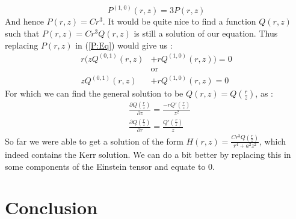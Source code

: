 \documentclass[a4paper,12pt]{article}
\theoremstyle{definition}
\begin{document}
\begin{equation*}
	P^{(1,0)}(r,z)=3P(r,z)
\end{equation*}
And hence $P(r,z)=Cr^3$. It would be quite nice to find a function $Q(r,z)$ such that $P(r,z)=Cr^3Q(r,z)$ is still a solution of our equation.
Thus replacing $P(r,z)$ in (\ref{P:Eq}) would give us :
\begin{align*}
	r(z Q^{(0,1)}(r,z)&+r Q^{(1,0)}(r,z))=0\\
	&\text{or}\\
	z Q^{(0,1)}(r,z)&+r Q^{(1,0)}(r,z)=0
\end{align*}
For which we can find the general solution to be $Q(r,z)=Q(\frac{r}{z})$, as :
\begin{align*}
	&\frac{\partial Q(\frac{r}{z})}{\partial z}=\frac{-rQ'(\frac{r}{z})}{z^2}\\
	&\frac{\partial Q(\frac{r}{z})}{\partial r}= \frac{Q'(\frac{r}{z})}{z}
\end{align*}
So far we were able to get a solution of the form $H(r,z)=\frac{Cr^3Q(\frac{r}{z})}{r^4+a^2z^2}$, which indeed contains the Kerr solution.
We can do a bit better by replacing this in some components of the Einstein tensor and equate to $0$.

\section{Conclusion}
\end{document}
